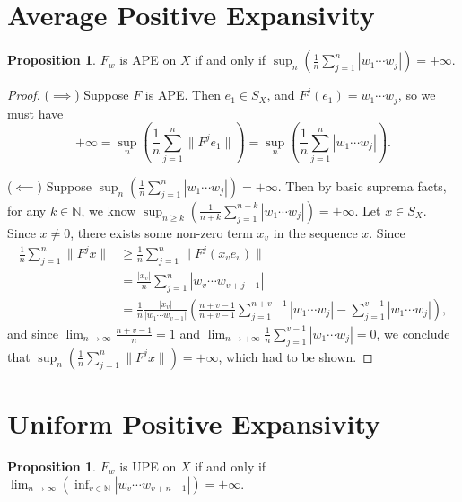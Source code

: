 \documentclass{article}
\newcommand{\ds}{\displaystyle}
\theoremstyle{definition}\newtheorem{remark}[theorem]{Remark}
\theoremstyle{definition}\newtheorem{example}[theorem]{Example}
\theoremstyle{definition}\newtheorem{fact}[theorem]{Fact}
\theoremstyle{definition}\newtheorem{diagram}[theorem]{Diagram}
\theoremstyle{definition}\newtheorem{definition}[theorem]{Definition}
\theoremstyle{definition}\newtheorem{question}[theorem]{Question}
\newtheorem{proposition}[theorem]{Proposition}
\newcommand{\N}{\mathbb{N}}
\begin{document}
\section{Average Positive Expansivity}

\begin{proposition}
    $F_w$ is APE on $X$ if and only if $\sup_n \left(\frac 1n\sum_{j=1}^n |w_1\cdots w_j|\right)=+\infty$.
\end{proposition}

\begin{proof}
    ($\implies$) Suppose $F$ is APE. Then $e_1\in S_X$, and $F^j(e_1)=w_1\cdots w_j$, so we must have 
    \[+\infty=\sup_n \left(\frac 1n \sum_{j=1}^n \|F^j e_1\|\right)=\sup_n \left(\frac 1n \sum_{j=1}^n |w_1\cdots w_j|\right).\]

    ($\impliedby$) Suppose $\sup_n \left(\frac 1n\sum_{j=1}^n |w_1\cdots w_j|\right)=+\infty$. Then by basic suprema facts, for any $k\in \N$, we know $\sup_{n\geq k} \left(\frac {1}{n+k}\sum_{j=1}^{n+k} |w_1\cdots w_j|\right)=+\infty$. Let $x\in S_X$. Since $x\not = 0$, there exists some non-zero term $x_v$ in the sequence $x$. Since
    \begin{align*}
        \frac 1n \sum_{j=1}^n \|F^j x\| &  \geq \frac 1n \sum_{j=1}^n \|F^j (x_v e_v)\| \\
        & = \frac{|x_v|}{n} \sum_{j=1}^n |w_v\cdots w_{v+j-1}|\\
        & = \frac{1}{n}\frac{|x_v|}{|w_1\cdots w_{v-1}|} \left( \frac{n+v-1}{n+v-1}\sum_{j=1}^{n+v-1} |w_1\cdots w_j| - \sum_{j=1}^{v-1} |w_1\cdots w_j|\right),
    \end{align*}
    \sloppy and since $\lim_{n\to \infty} \frac{n+v-1}{n}=1$ and $\lim_{n\to +\infty} \frac{1}{n} \sum_{j=1}^{v-1} |w_1\cdots w_j|=0$, we conclude that $\sup_n \left(\frac 1n \sum_{j=1}^n \|F^j x\|\right)=+\infty$, which had to be shown.
\end{proof}

\section{Uniform Positive Expansivity}

\begin{proposition}
    $F_w$ is UPE on $X$ if and only if $\ds\lim_{n\to \infty} (\inf_{v\in \N} |w_v\cdots w_{v+n-1}|)=+\infty.$
\end{proposition}
\end{document}
